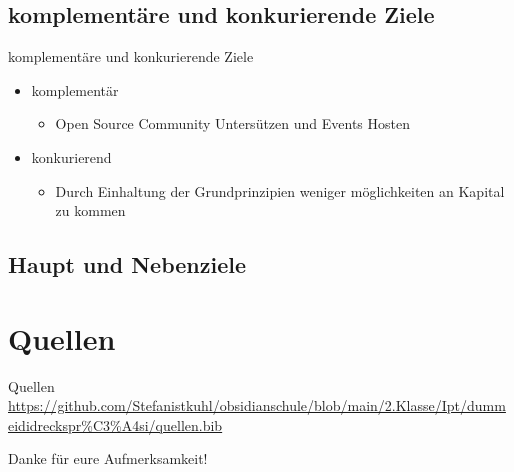 \documentclass[11pt,aspectratio=169]{beamer}
\begin{document}
\subsection {komplementäre und konkurierende Ziele}
\begin{frame}{komplementäre und konkurierende Ziele}
	\begin{itemize}
		\item komplementär
		      \begin{itemize}
			      \item Open Source Community Untersützen und Events Hosten
		      \end{itemize}
	\end{itemize}
	\begin{itemize}
		\item konkurierend
		      \begin{itemize}
			      \item Durch Einhaltung der Grundprinzipien weniger möglichkeiten an Kapital zu kommen
		      \end{itemize}
	\end{itemize}
\end{frame}

\subsection {Haupt und Nebenziele}

\section{Quellen}
\begin{frame}{Quellen}
	\centering
	\url{https://github.com/Stefanistkuhl/obsidianschule/blob/main/2.Klasse/Ipt/dummeididreckspr\%C3\%A4si/quellen.bib}
	
	
\end{frame}
\begin{frame}{Danke für eure Aufmerksamkeit!}
\end{frame}
\end{document}
